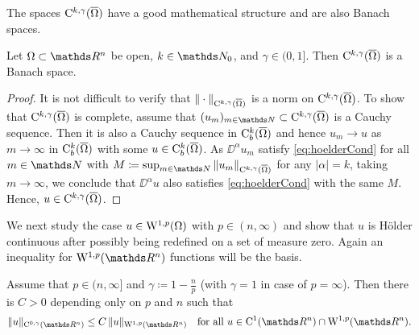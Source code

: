 The spaces $\mathrm{C}^{k,\gamma}(\overline\Omega)$ have a good mathematical structure and are also Banach spaces.

\begin{prop}
  Let $\Omega \subset \R^n$ be open, $k \in \N_0$, and $\gamma \in (0,1]$.
  Then $\mathrm{C}^{k,\gamma}(\overline\Omega)$ is a Banach space.
\end{prop}

\begin{proof}
  It is not difficult to verify that $\| \cdot \|_{\mathrm{C}^{k,\gamma}(\overline\Omega)}$ is a norm on $\mathrm{C}^{k,\gamma}(\overline\Omega)$.
  To show that $\mathrm{C}^{k,\gamma}(\overline\Omega)$ is complete, assume that $(u_m)_{m \in \N} \subset \CC^{k,\gamma}(\overline\Omega)$ is a Cauchy sequence.
  Then it is also a Cauchy sequence in $\mathrm{C}_b^k(\overline\Omega)$ and hence $u_m \to u$ as $m \to \infty$ in $\mathrm{C}_b^k(\overline\Omega)$ with some $u \in \mathrm{C}_b^k(\overline\Omega)$.
  As $\DD^\alpha u_m$ satisfy \eqref{eq:hoelderCond} for all $m \in \N$ with $M \coloneqq \sup_{m \in \N} \| u_m\|_{\CC^{k,\gamma}(\overline\Omega)}$ for any $|\alpha| = k$, taking $m \to \infty$, we conclude that $\DD^\alpha u$ also satisfies \eqref{eq:hoelderCond} with the same $M$.
  Hence, $u \in \mathrm{C}^{k,\gamma}(\overline\Omega)$.
\end{proof}

We next study the case $u \in \mathrm{W}^{1,p}(\Omega)$ with $p \in (n,\infty)$ and show that $u$ is Hölder continuous after possibly being redefined on a set of measure zero.
Again an inequality for $\WW^{1,p}(\R^n)$ functions will be the basis.

\begin{thm}
Assume that $p \in (n,\infty]$ and $\gamma \coloneqq 1 - \frac{n}{p}$ (with $\gamma = 1$ in case of $p = \infty$).
Then there is $C > 0$ depending only on $p$ and $n$ such that
\begin{equation}
  \label{eq:morrey}
  \|u\|_{\CC^{0,\gamma}(\R^n)} \leq C \, \|u\|_{\WW^{1,p}(\R^n)} \quad\text{for all } u \in \CC^1(\R^n) \cap \WW^{1,p}(\R^n).
\end{equation}
\end{thm}

